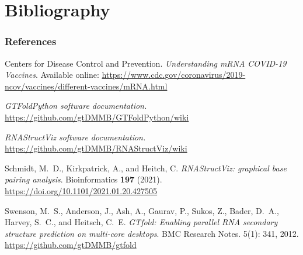 \documentclass[usenames,svgnames,dvipsnames,11pt]{beamer}
\begin{document}
\section{Bibliography} 

\begin{frame}[t,allowframebreaks] 
\frametitle{References} 

\footnotesize 
\begin{thebibliography}{10}

Centers for Disease Control and Prevention. 
\emph{Understanding mRNA COVID-19 Vaccines}. 
Available online: 
\url{https://www.cdc.gov/coronavirus/2019-ncov/vaccines/different-vaccines/mRNA.html} 

\emph{GTFoldPython software documentation.} 
\url{https://github.com/gtDMMB/GTFoldPython/wiki}

\emph{RNAStructViz software documentation.} 
\url{https://github.com/gtDMMB/RNAStructViz/wiki}

Schmidt, M.~D., Kirkpatrick, A., and Heitch, C. \emph{RNAStructViz: graphical base pairing analysis}. 
Bioinformatics {\bf 197} (2021). 
\url{https://doi.org/10.1101/2021.01.20.427505}

Swenson, M.~S., Anderson, J., Ash, A., Gaurav, P., Sukos, Z., Bader, D.~A., 
Harvey, S.~C., and Heitsch, C.~E. 
\emph{GTfold: Enabling parallel RNA secondary structure prediction on multi-core desktops}. 
BMC Research Notes. 5(1): 341, 2012. 
\url{https://github.com/gtDMMB/gtfold}

\end{thebibliography}

\end{frame} 

\end{document}
